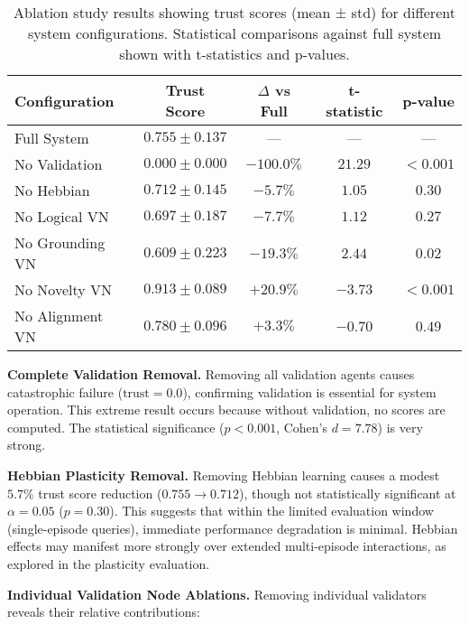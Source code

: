 \documentclass{article}
\begin{document}
\begin{table}[h]
\centering
\caption{Ablation study results showing trust scores (mean ± std) for different system configurations. Statistical comparisons against full system shown with t-statistics and p-values.}
\label{tab:ablation}
\begin{tabular}{lcccc}
\toprule
\textbf{Configuration} & \textbf{Trust Score} & \textbf{$\Delta$ vs Full} & \textbf{t-statistic} & \textbf{p-value} \\
\midrule
Full System & $0.755 \pm 0.137$ & --- & --- & --- \\
No Validation & $0.000 \pm 0.000$ & $-100.0\%$ & $21.29$ & $< 0.001$ \\
No Hebbian & $0.712 \pm 0.145$ & $-5.7\%$ & $1.05$ & $0.30$ \\
No Logical VN & $0.697 \pm 0.187$ & $-7.7\%$ & $1.12$ & $0.27$ \\
No Grounding VN & $0.609 \pm 0.223$ & $-19.3\%$ & $2.44$ & $0.02$ \\
No Novelty VN & $0.913 \pm 0.089$ & $+20.9\%$ & $-3.73$ & $< 0.001$ \\
No Alignment VN & $0.780 \pm 0.096$ & $+3.3\%$ & $-0.70$ & $0.49$ \\
\bottomrule
\end{tabular}
\end{table}

\textbf{Complete Validation Removal.} Removing all validation agents causes catastrophic failure ($\text{trust} = 0.0$), confirming validation is essential for system operation. This extreme result occurs because without validation, no scores are computed. The statistical significance ($p < 0.001$, Cohen's $d = 7.78$) is very strong.

\textbf{Hebbian Plasticity Removal.} Removing Hebbian learning causes a modest $5.7\%$ trust score reduction ($0.755 \to 0.712$), though not statistically significant at $\alpha = 0.05$ ($p = 0.30$). This suggests that within the limited evaluation window (single-episode queries), immediate performance degradation is minimal. Hebbian effects may manifest more strongly over extended multi-episode interactions, as explored in the plasticity evaluation.

\textbf{Individual Validation Node Ablations.} Removing individual validators reveals their relative contributions:
\end{document}
